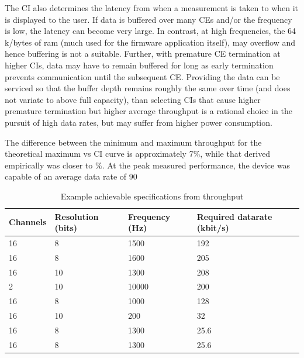 \documentclass[]{article}
\begin{document}
The \ac{CI} also determines the latency from when a measurement is taken to when it is displayed to the user. If data is buffered over many \ac{CE}s and/or the frequency is low, the latency can become very large. In contrast, at high frequencies, the 64 k/bytes of ram (much used for the firmware application itself), may overflow and hence buffering is not a suitable. Further, with premature \ac{CE} termination at higher \ac{CI}s, data may have to remain buffered for long as early termination prevents communication until the subsequent \ac{CE}. Providing the data can be serviced so that the buffer depth remains roughly the same over time (and does not variate to above full capacity), than selecting \ac{CI}s that cause higher premature termination but higher average throughput is a rational choice in the pursuit of high data rates, but may suffer from higher power consumption.  



The difference between the minimum and maximum throughput for the theoretical maximum vs \ac{CI} curve is approximately 7$\%$, while that derived empirically was closer to $\%$. At the peak measured performance, the device was capable of an average data rate of 90%



\begin{table}[H]
\centering
\caption{Example achievable specifications from throughput}
\label{fig:sensors}
\begin{tabular}{|p{1.1in}|p{1.1in}|p{1.1in}|p{1.1in}|} \hline 
\textbf{Channels} & \textbf{Resolution (bits)} & \textbf{Frequency (Hz)} & \textbf{Required datarate (kbit/s)} \\ \hline 
16 & 8 & 1500 & 192 \\ \hline  
16 & 8 & 1600 & 205 \\ \hline
16 & 10 & 1300 & 208 \\ \hline  
2 & 10 & 10000 & 200  \\ \hline  
16 & 8 & 1000 & 128 \\ \hline  
16 & 10 & 200 & 32 \\ \hline  
16 & 8 & 1300 & 25.6 \\ \hline  
16 & 8 & 1300 & 25.6 \\ \hline  

\end{tabular}
\end{table}
\end{document}
